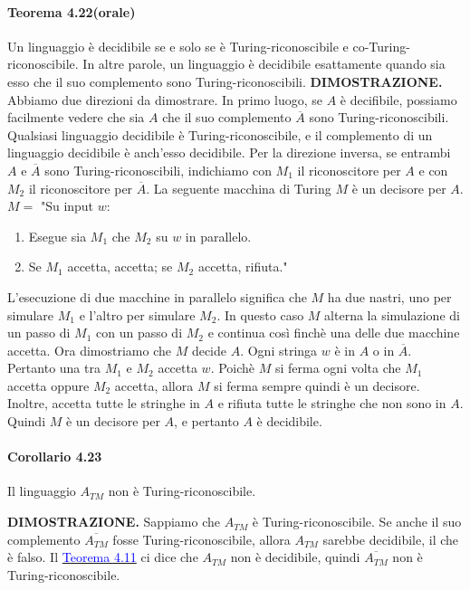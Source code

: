 \documentclass{article}
\begin{document}
\paragraph{Teorema 4.22(orale)}
\label{teorema-4.22}
\text{}
\newline
Un linguaggio è decidibile se e solo se è Turing-riconoscibile e co-Turing-riconoscibile.
\newline
In altre parole, un linguaggio è decidibile esattamente quando sia esso che il suo complemento sono Turing-riconoscibili.
\vspace{1em}
\text{}
\newline
\hbox{\textbf{DIMOSTRAZIONE.}}
Abbiamo due direzioni da dimostrare.
In primo luogo, se $A$ è decifibile, possiamo facilmente vedere che sia $A$ che il suo complemento $\overline{A}$ sono Turing-riconoscibili.
Qualsiasi linguaggio decidibile è Turing-riconoscibile, e il complemento di un linguaggio decidibile è anch'esso decidibile.
Per la direzione inversa, se entrambi $A$ e $\overline{A}$ sono Turing-riconoscibili, indichiamo con $M_1$ il riconoscitore per $A$ e con $M_2$ il riconoscitore per $\overline{A}$.
La seguente macchina di Turing $M$ è un decisore per $A$.
\vspace{1em}
\text{}
\newline
$M = $ "Su input $w$:
\begin{enumerate}
    \item Esegue sia $M_1$ che $M_2$ su $w$ in parallelo.
    \item Se $M_1$ accetta, accetta; se $M_2$ accetta, rifiuta."
\end{enumerate}
L'esecuzione di due macchine in parallelo significa che $M$ ha due nastri, uno per simulare $M_1$ e l'altro per simulare $M_2$.
In questo caso $M$ alterna la simulazione di un passo di $M_1$ con un passo di $M_2$ e continua così finchè una delle due macchine accetta.
Ora dimostriamo che $M$ decide $A$.
Ogni stringa $w$ è in $A$ o in $\overline{A}$.
Pertanto una tra $M_1$ e $M_2$ accetta $w$.
Poichè $M$ si ferma ogni volta che $M_1$ accetta oppure $M_2$ accetta, allora $M$ si ferma sempre quindi è un decisore.
Inoltre, accetta tutte le stringhe in $A$ e rifiuta tutte le stringhe che non sono in $A$.
Quindi $M$ è un decisore per $A$, e pertanto $A$ è decidibile.
\newline
\paragraph*{Corollario 4.23}
\label{corollario-4.23}
\text{}
\newline
\begin{tcolorbox}[title=Corollario 4.23]
Il linguaggio $A_{TM}$ non è Turing-riconoscibile.
\end{tcolorbox}
\vspace{1em}
\text{}
\newline
\hbox{\textbf{DIMOSTRAZIONE.}}
Sappiamo che $A_{TM}$ è Turing-riconoscibile.
Se anche il suo complemento $\overline{A_{TM}}$ fosse Turing-riconoscibile, allora $A_{TM}$ sarebbe decidibile, il che è falso.
Il \hyperref[teorema-4.11]{\textcolor{blue}{Teorema 4.11}} ci dice che $A_{TM}$ non è decidibile, quindi $\overline{A_{TM}}$ non è Turing-riconoscibile.
\newpage
\end{document}
